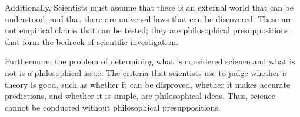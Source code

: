 \documentclass[UTF8,a4paper,AutoFakeBold,AutoFakeSlant]{article}
\begin{document}
Additionally, Scientists must assume that there is an external world that can be understood, and 
that there are universal laws that can be discovered. These are not empirical claims that can be tested; 
they are philosophical presuppositions that form the bedrock of scientific investigation.

Furthermore, the problem of determining what is considered science and what is not is a philosophical issue. 
The criteria that scientists use to judge whether a theory is good, such as whether it can be disproved, 
whether it makes accurate predictions, and whether it is simple, are philosophical ideas.
Thus, science cannot be conducted without philosophical presuppositions.



% 
% 
% 
\end{document}
